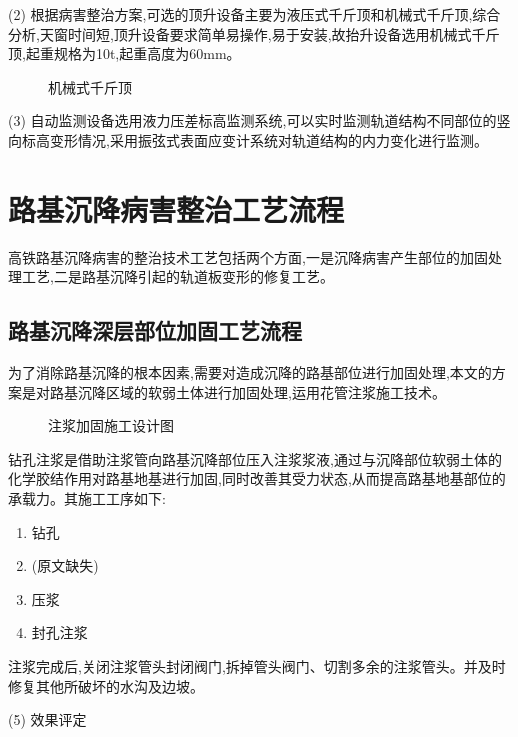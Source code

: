 \documentclass[a4paper,12pt]{ctexrep}
\begin{document}
(2) 根据病害整治方案,可选的顶升设备主要为液压式千斤顶和机械式千斤顶,综合分析,天窗时间短,顶升设备要求简单易操作,易于安装,故抬升设备选用机械式千斤顶,起重规格为10t,起重高度为60mm。

\begin{figure}[htbp]
    \centering
    \caption{机械式千斤顶}
    \label{fig:2-6}
\end{figure}

(3) 自动监测设备选用液力压差标高监测系统,可以实时监测轨道结构不同部位的竖向标高变形情况,采用振弦式表面应变计系统对轨道结构的内力变化进行监测。

\section{路基沉降病害整治工艺流程}

高铁路基沉降病害的整治技术工艺包括两个方面,一是沉降病害产生部位的加固处理工艺,二是路基沉降引起的轨道板变形的修复工艺。

\subsection{路基沉降深层部位加固工艺流程}

为了消除路基沉降的根本因素,需要对造成沉降的路基部位进行加固处理,本文的方案是对路基沉降区域的软弱土体进行加固处理,运用花管注浆施工技术。

\begin{figure}[htbp]
    \centering
    \caption{注浆加固施工设计图}
    \label{fig:2-7}
\end{figure}

钻孔注浆是借助注浆管向路基沉降部位压入注浆浆液,通过与沉降部位软弱土体的化学胶结作用对路基地基进行加固,同时改善其受力状态,从而提高路基地基部位的承载力。其施工工序如下:

\begin{enumerate}
    \item 钻孔
    \item (原文缺失)
    \item 压浆
    \item 封孔注浆
\end{enumerate}

注浆完成后,关闭注浆管头封闭阀门,拆掉管头阀门、切割多余的注浆管头。并及时修复其他所破坏的水沟及边坡。

(5) 效果评定
\end{document}
